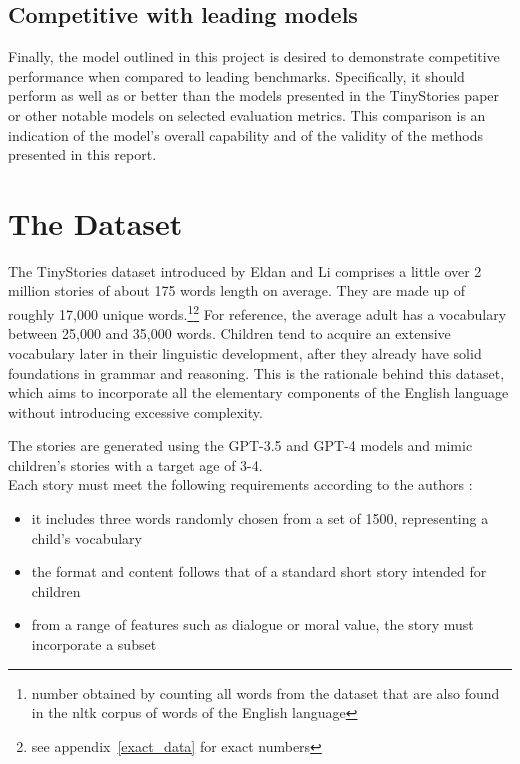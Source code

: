 \documentclass[11pt]{article}
\begin{document}
    \subsection*{Competitive with leading models}
    Finally, the model outlined in this project is desired to demonstrate competitive performance when compared to leading benchmarks.
    Specifically, it should perform as well as or better than the models presented in the TinyStories paper or other notable models on selected evaluation metrics. This comparison is an indication of the model's overall capability and of the validity of the methods presented in this report.

    \section{The Dataset}
    The TinyStories dataset introduced by Eldan and Li \cite{tinystories}
    comprises a little over 2 million stories of about 175 words length on average. They are made up of roughly 17,000 unique words.\footnote{number obtained by counting all words from the dataset that are also found in the nltk corpus of words of the English language\label{fn:firstfootnote}}\footnote{see appendix~\ref{exact_data} for exact numbers}
    For reference, the average adult has a vocabulary between 25,000 and 35,000 words. \cite{wordcounter}
    Children tend to acquire an extensive vocabulary later in their linguistic development, after they already have solid foundations in grammar and reasoning. This is the rationale behind this dataset, which aims to incorporate all the elementary components of the English language without introducing excessive complexity.

    The stories are generated using the GPT-3.5 and GPT-4 models and mimic children's stories with a target age of 3-4.\\
    Each story must meet the following requirements according to the authors \cite{tinystories}:
    \begin{itemize}
        \item it includes three words randomly chosen from a set of 1500, representing a child's vocabulary
        \item the format and content follows that of a standard short story intended for children
        \item from a range of features such as dialogue or moral value, the story must incorporate a subset
    \end{itemize}
\end{document}
